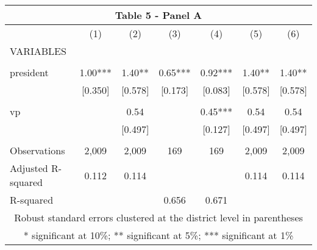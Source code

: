 \begin{tabular}{lcccccc}
\multicolumn{7}{c}{Table 5 - Panel A} \\ \hline
 & (1) & (2) & (3) & (4) & (5) & (6) \\
VARIABLES &  &  &  &  &  &  \\ \hline
 &  &  &  &  &  &  \\
president & 1.00*** & 1.40** & 0.65*** & 0.92*** & 1.40** & 1.40** \\
 & [0.350] & [0.578] & [0.173] & [0.083] & [0.578] & [0.578] \\
 &  &  &  &  &  &  \\
vp &  & 0.54 &  & 0.45*** & 0.54 & 0.54 \\
 &  & [0.497] &  & [0.127] & [0.497] & [0.497] \\
 &  &  &  &  &  &  \\
Observations & 2,009 & 2,009 & 169 & 169 & 2,009 & 2,009 \\
Adjusted R-squared & 0.112 & 0.114 &  &  & 0.114 & 0.114 \\
 R-squared &  &  & 0.656 & 0.671 &  &  \\ \hline
\multicolumn{7}{c}{ Robust standard errors clustered at the district level in parentheses} \\
\multicolumn{7}{c}{ * significant at 10\%; ** significant at 5\%; *** significant at 1\%} \\
\end{tabular}
